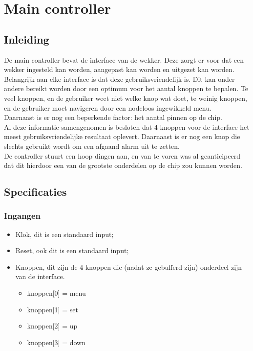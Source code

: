 \chapter{Main controller}
\section{Inleiding}
De main controller bevat de interface van de wekker. Deze zorgt er voor dat een wekker ingesteld kan worden, aangepast kan worden en uitgezet kan worden. 
Belangrijk aan elke interface is dat deze gebruiksvriendelijk is. 
Dit kan onder andere bereikt worden door een optimum voor het aantal knoppen te bepalen. 
Te veel knoppen, en de gebruiker weet niet welke knop wat doet, te weinig knoppen, en de gebruiker moet navigeren door een nodeloos ingewikkeld menu. \\
Daarnaast is er nog een beperkende factor: het aantal pinnen op de chip. \\
Al deze informatie samengenomen is besloten dat 4 knoppen voor de interface het meest gebruiksvriendelijke resultaat oplevert. Daarnaast is er nog een knop die slechts gebruikt wordt om een afgaand alarm uit te zetten. \\
De controller stuurt een hoop dingen aan, en van te voren was al geanticipeerd dat dit hierdoor een van de grootste onderdelen op de chip zou kunnen worden.

\section{Specificaties}
\subsection{Ingangen}
\begin{itemize}[nolistsep]
\item Klok, dit is een standaard input;
\item Reset, ook dit is een standaard input;
\item Knoppen, dit zijn de 4 knoppen die (nadat ze gebufferd zijn) onderdeel zijn van de interface.
\begin{itemize}[nolistsep]
\item knoppen[0] = menu
\item knoppen[1] = set 
\item knoppen[2] = up
\item knoppen[3] = down\\
\end{itemize}
\end{itemize}



